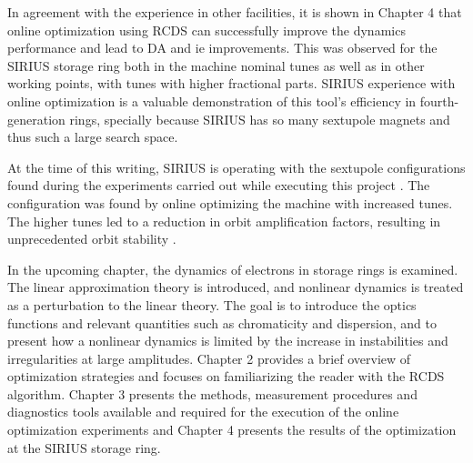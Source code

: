 In agreement with the experience in other facilities, it is shown in Chapter 4 that online optimization using \gls*{RCDS} can successfully improve the dynamics performance and lead to \gls*{DA} and \gls*{ie} improvements. This was observed for the SIRIUS storage ring both in the machine nominal tunes as well as in other working points, with tunes with higher fractional parts.  SIRIUS experience with online optimization is a valuable demonstration of this tool's efficiency in fourth-generation rings, specially because SIRIUS has so many sextupole magnets and thus such a large search space.

At the time of this writing, SIRIUS is operating with the sextupole configurations found during the experiments carried out while executing this project \cite{velloso_online_2023}. The configuration was found by online optimizing the machine with increased tunes. The higher tunes led to a reduction in orbit amplification factors, resulting in unprecedented orbit stability \cite{liu_status_2023}.

In the upcoming chapter, the dynamics of electrons in storage rings is examined. The linear approximation theory is introduced, and nonlinear dynamics is treated as a perturbation to the linear theory. The goal is to introduce the optics functions and relevant quantities such as chromaticity and dispersion, and to present how a nonlinear dynamics is limited by the increase in instabilities and irregularities at large amplitudes. Chapter 2 provides a brief overview of optimization strategies and focuses on familiarizing the reader with the \gls*{RCDS} algorithm. Chapter 3 presents the methods, measurement procedures and diagnostics tools available and required for the execution of the online optimization experiments and Chapter 4 presents the results of the optimization at the SIRIUS storage ring.
